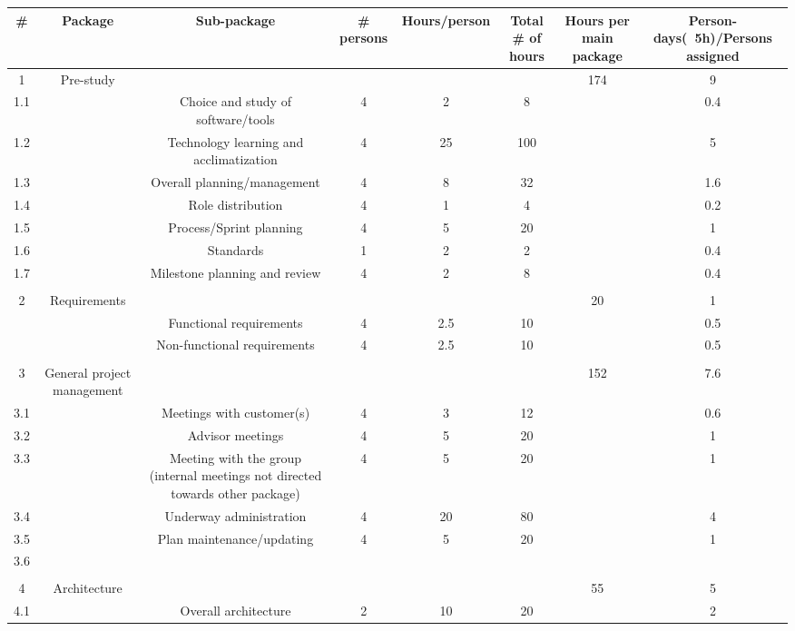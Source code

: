 \begin{table}
\centering
\begin{tabular}{|c|c|c|c|c|c|c|c|}
\hline
\# & Package & Sub-package & \# persons & Hours/person & Total \# of hours & Hours per main package & Person-days(~5h)/Persons assigned\\ 
\hline
1 & Pre-study &  &  &  &  & 174 & 9\\ 
\hline
1.1 &  & Choice and study of software/tools & 4 & 2 & 8 &  & 0.4\\ 
\hline
1.2 &  & Technology learning and acclimatization & 4 & 25 & 100 &  & 5\\ 
\hline
1.3 &  & Overall planning/management & 4 & 8 & 32 &  & 1.6\\ 
\hline
1.4 &  & Role distribution & 4 & 1 & 4 &  & 0.2\\ 
\hline
1.5 &  & Process/Sprint planning & 4 & 5 & 20 &  & 1\\ 
\hline
1.6 &  & Standards & 1 & 2 & 2 &  & 0.4\\ 
\hline
1.7 &  & Milestone planning and review & 4 & 2 & 8 &  & 0.4\\ 
\hline
 &  &  &  &  &  &  & \\ 
\hline
2 & Requirements &  &  &  &  & 20 & 1\\ 
\hline
 &  & Functional requirements & 4 & 2.5 & 10 &  & 0.5\\ 
\hline
 &  & Non-functional requirements & 4 & 2.5 & 10 &  & 0.5\\ 
\hline
 &  &  &  &  &  &  & \\ 
\hline
3 & General project management &  &  &  &  & 152 & 7.6\\ 
\hline
3.1 &  & Meetings with customer(s)  & 4 & 3 & 12 &  & 0.6\\ 
\hline
3.2 &  & Advisor meetings  & 4 & 5 & 20 &  & 1\\ 
\hline
3.3 &  & Meeting with the group (internal meetings not directed towards other package) & 4 & 5 & 20 &  & 1\\ 
\hline
3.4 &  & Underway administration & 4 & 20 & 80 &  & 4\\ 
\hline
3.5 &  & Plan maintenance/updating & 4 & 5 & 20 &  & 1\\ 
\hline
3.6 &  &  &  &  &  &  & \\ 
\hline
 &  &  &  &  &  &  & \\ 
\hline
4 & Architecture &  &  &  &  & 55 & 5\\ 
\hline
4.1 &  & Overall architecture & 2 & 10 & 20 &  & 2\\ 

\end{tabular}
\end{table}
